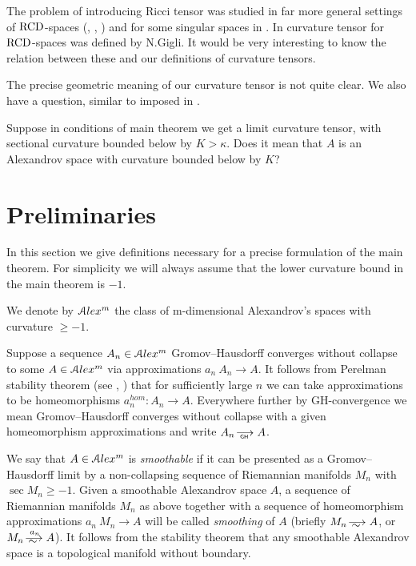 \documentclass[a4paper,10pt]{article}
\begin{document}
The problem of introducing Ricci tensor
was 
studied in far more general settings of 
 $\operatorname{RCD}$-spaces (\cite{G1}, \cite{St}, \cite{H})
 and
for some singular  spaces in \cite{L}.
In \cite{G}  curvature tensor for  $\operatorname{RCD}$-spaces was defined by
 N.Gigli. It would be very interesting to know 
the relation between these and our definitions
of curvature tensors.

The precise geometric meaning of our curvature tensor is not quite clear. 
We also have a question, similar to imposed in \cite[Conjecture~1.1]{G}.

Suppose in conditions of main theorem we get
a limit curvature tensor, with sectional curvature bounded
below by $K>\kappa$.
Does it mean that $A$ is an Alexandrov space with curvature
bounded below by $K$?


\section{Preliminaries}

\medskip
In this section we give definitions necessary for a precise formulation 
of the main theorem.
For simplicity  we will always assume that the lower
curvature bound in the main theorem is  $-1$. 

We denote by
$\mathcal{A}lex^m$ the class of m-dimensional Alexandrov's spaces
with curvature $\ge -1$.

Suppose a sequence $A_n\in \mathcal{A}lex^m$ Gromov--Hausdorff converges without collapse to some
$A\in \mathcal{A}lex^m$ via
approximations $a_n\:A_n\to A$.
It follows from Perelman stability theorem (see \cite{PerStab}, \cite{KapStab})
that for sufficiently large $n$  we can take approximations
to be homeomorphisms $a_n^{hom}: A_n\to A$.
Everywhere further by GH-convergence we mean 
Gromov--Hausdorff converges without collapse with a given
homeomorphism
approximations and write $A_n\GHto A$.


We say that $A\in \mathcal{A}lex^m$ is \emph{ smoothable }
if it can be presented as a Gromov--Hausdorff limit by a non-collapsing sequence of Riemannian manifolds $M_n$ with $\sec M_n\ge-1$.
Given a smoothable Alexandrov space $A$,
a sequence of Riemannian manifolds $M_n$ as above
together with a sequence of homeomorphism approximations $a_n\:M_n\to A$
will be called \emph{smoothing} of $A$
(briefly $M_n\smooths{} A$, or $M_n\smooths{a_n} A$).
It follows from the stability theorem that any smoothable Alexandrov space is a topological manifold without boundary.
\end{document}
